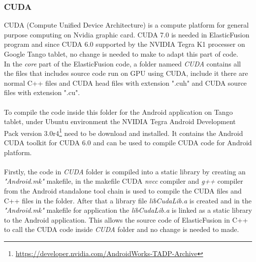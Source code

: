 \documentclass[12pt,twoside]{article}
\begin{document}
\subsubsection{CUDA}
CUDA (Compute Unified Device Architecture) is a compute platform for general purpose computing on Nvidia graphic card. CUDA 7.0 is needed in ElasticFusion program and since CUDA 6.0 supported by the NVIDIA Tegra K1 processer on Google Tango tablet, no change is needed to make to adapt this part of code. \\
In the \textit{core} part of the ElasticFusion code, a folder nameed \textit{CUDA} contains all the files that includes source code run on GPU using CUDA, include it there are normal C++ files and CUDA head files with extension ".cuh" and CUDA source files with extension ".cu".\\
\\
To compile the code inside this folder for the Android application on Tango tablet, under Ubuntu environment the NVIDIA Tegra Android Development Pack version 3.0r4\footnote{\url{https://developer.nvidia.com/AndroidWorks-TADP-Archive}} need to be download and installed. It contains the Android CUDA toolkit for CUDA 6.0 and can be used to compile CUDA code for Android platform.\\
\\
Firstly, the code in \textit{CUDA} folder is compiled into a static library by creating an \textit{"Android.mk"} makefile, in the makefile CUDA \textit{nvcc} compiler and \textit{g++} compiler from the Android standalone tool chain is used to compile the CUDA files and C++ files in the folder. After that a library file \textit{libCudaLib.a} is created and in the \textit{"Android.mk"} makefile for application the \textit{libCudaLib.a} is linked as a static library to the Android application. This allows the source code of ElasticFusion in C++ to call the CUDA code inside \textit{CUDA} folder and no change is needed to made.\\ 
\end{document}
